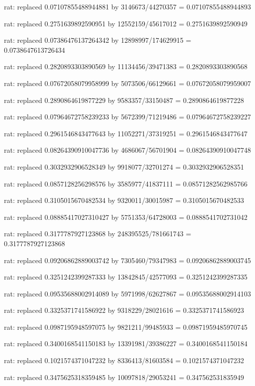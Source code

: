 \documentclass[a4paper,10pt]{article}
\begin{document}
\begin{eulernotebook}
\begin{eulercomment}
\begin{eulercomment}
\begin{eulercomment}
\begin{eulercomment}
\begin{eulercomment}
\begin{eulercomment}
\begin{eulercomment}
\begin{eulercomment}
\begin{eulercomment}
\begin{eulercomment}
\begin{eulercomment}
\begin{eulercomment}
\begin{eulercomment}
\begin{eulercomment}
\begin{eulercomment}
\begin{eulercomment}
\begin{euleroutput}
  rat: replaced 0.07107855488944881 by 3146673/44270357 = 0.07107855488944893
  
  rat: replaced 0.2751639892590951 by 12552159/45617012 = 0.2751639892590949
  
  rat: replaced 0.07386476137264342 by 12898997/174629915 = 0.0738647613726434
  
  rat: replaced 0.2820893303890569 by 11134456/39471383 = 0.2820893303890568
  
  rat: replaced 0.07672058079958999 by 5073506/66129661 = 0.07672058079959007
  
  rat: replaced 0.2890864619877229 by 9583357/33150487 = 0.2890864619877228
  
  rat: replaced 0.07964672758239233 by 5672399/71219486 = 0.07964672758239227
  
  rat: replaced 0.2961546843477643 by 11052271/37319251 = 0.2961546843477647
  
  rat: replaced 0.08264390910047736 by 4686067/56701904 = 0.08264390910047748
  
  rat: replaced 0.3032932906528349 by 9918077/32701274 = 0.3032932906528351
  
  rat: replaced 0.0857128256298576 by 3585977/41837111 = 0.08571282562985766
  
  rat: replaced 0.3105015670482534 by 9320011/30015987 = 0.3105015670482533
  
  rat: replaced 0.08885417027310427 by 5751353/64728003 = 0.0888541702731042
  
  rat: replaced 0.3177787927123868 by 248395525/781661743 = 0.3177787927123868
  
  rat: replaced 0.09206862889003742 by 7305460/79347983 = 0.09206862889003745
  
  rat: replaced 0.3251242399287333 by 13842845/42577093 = 0.3251242399287335
  
  rat: replaced 0.09535688002914089 by 5971998/62627867 = 0.09535688002914103
  
  rat: replaced 0.3325371741586922 by 9318229/28021616 = 0.3325371741586923
  
  rat: replaced 0.0987195948597075 by 9821211/99485933 = 0.09871959485970745
  
  rat: replaced 0.3400168541150183 by 13391981/39386227 = 0.3400168541150184
  
  rat: replaced 0.1021574371047232 by 8336413/81603584 = 0.1021574371047232
  
  rat: replaced 0.3475625318359485 by 10097818/29053241 = 0.347562531835949
  

\end{euleroutput}
\end{eulercomment}
\end{eulercomment}
\end{eulercomment}
\end{eulercomment}
\end{eulercomment}
\end{eulercomment}
\end{eulercomment}
\end{eulercomment}
\end{eulercomment}
\end{eulercomment}
\end{eulercomment}
\end{eulercomment}
\end{eulercomment}
\end{eulercomment}
\end{eulercomment}
\end{eulercomment}
\end{eulernotebook}
\end{document}

